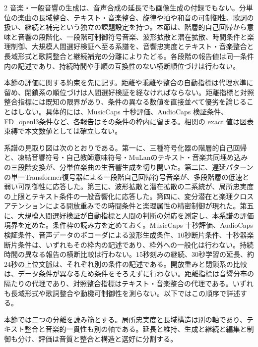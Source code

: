 \documentclass[lualatex,a4paper,10pt]{jlreq}
\begin{document}
\begin{multicols}{2}
\raggedcolumns
音楽・一般音響の生成は、音声合成の延長でも画像生成の付録でもない。分単位の楽曲の長域整合、テキスト・音楽整合、旋律や拍や和音の可制御性、歌詞の扱い、継続と補完という独立の課題設定を持つ\autocite{btd063,btd065}。本節は、階層的自己回帰から意味と音響の段階化、一段階可制御符号音楽、波形拡散と潜在拡散、時間条件と楽理制御、大規模人間選好検証へ至る系譜を、音響忠実度とテキスト・音楽整合と長域形式と歌詞整合と継続補完の分離によりたどる\autocite{btd063,btd065,btd066}。各段階の報告値は同一条件内の記述であり、持続時間や手順の互換性のない横断順位づけは行わない\autocite{btd066,btd067,btd068}。

本節の評価に関する約束を先に記す。距離や乖離や整合の自動指標は代理水準に留め、閉鎖系の順位づけは人間選好検証を経なければならない\autocite{btd136}。距離指標と対照整合指標には既知の限界があり、条件の異なる数値を直接並べて優劣を論じることはしない\autocite{btd063,btd065,btd066,btd067,btd068,btd136}。具体的には、MusicCaps 十秒評価、AudioCaps 検証条件、FD\_openl3条件など、各報告はその条件の枠内に留まる\autocite{btd065,btd067,btd068}。相関の exact 値は図表束縛で本文数値としては確立しない\autocite{btd136}。

系譜の見取り図は次のとおりである。第一に、三種符号化器の階層的自己回帰と、凍結音響符号・自己教師意味符号・MuLanのテキスト・音楽共同埋め込みの三段階変換が、分単位楽曲の生音響生成を切り開いた\autocite{btd063,btd065}。第二に、遅延パターンの単一Transformer復号器による一段階自己回帰符号音楽が、多段階層の低速と弱い可制御性に応答した\autocite{btd066}。第三に、波形拡散と潜在拡散の二系統が、局所忠実度の上限とテキスト条件の一般音響化に応答した\autocite{btd064,btd067}。第四に、変分潜在と楽理クロスアテンションによる開放重みでの時間条件と楽理属性の精密制御が現れた\autocite{btd068,btd069}。第五に、大規模人間選好検証が自動指標と人間の判断の対応を測定し、本系譜の評価境界を定めた\autocite{btd136}。条件枠の読み方を定めておく。MusicCaps 十秒評価、AudioCaps 検証条件、音声データのボコーダによる波形生成条件、$10$秒断片条件、十秒器楽断片条件は、いずれもその枠内の記述であり、枠外への一般化は行わない\autocite{btd065,btd066,btd067,btd064,btd069,btd136}。持続時間の異なる報告の横断比較は行わない。$15$秒刻みの継続、$30$秒学習の延長、約$24$秒の上位文脈は、それぞれ別の条件の記述である\autocite{btd065,btd063}。開放重みと閉鎖系の比較は、データ条件が異なるため条件をそろえずに行わない\autocite{btd068}。距離指標は音響分布の隔たりの代理であり、対照整合指標はテキスト・音楽整合の代理である。いずれも長域形式や歌詞整合や動機可制御性を測らない\autocite{btd063,btd065,btd136}。以下ではこの順序で詳述する。

本節では二つの分離を読み筋とする。局所忠実度と長域構造は別の軸であり\autocite{btd063,btd064}、テキスト整合と音楽的一貫性も別の軸である\autocite{btd065,btd067}。延長と維持、生成と継続と編集と制御も分け、評価は音質と整合と構造と選好に分割する\autocite{btd065,btd067,btd068,btd069,btd136}。
\end{multicols}
\end{document}
